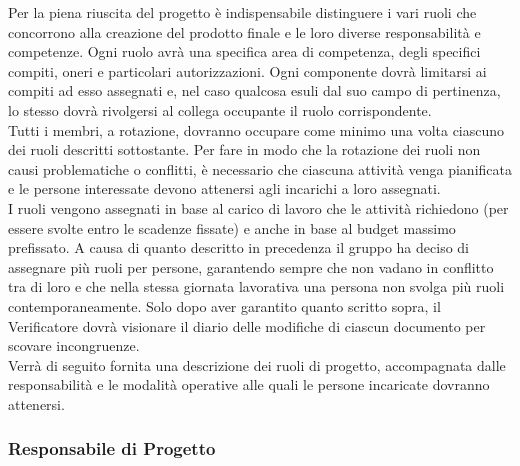 Per la piena riuscita del progetto è indispensabile distinguere i vari ruoli che concorrono alla creazione del prodotto finale e le loro diverse responsabilità e competenze.
Ogni ruolo avrà una specifica area di competenza, degli specifici compiti, oneri e particolari autorizzazioni. Ogni componente dovrà limitarsi ai compiti ad esso assegnati e, nel caso qualcosa esuli dal suo campo di pertinenza, lo stesso dovrà rivolgersi al collega occupante il ruolo corrispondente.\\
Tutti i membri, a rotazione, dovranno occupare come minimo una volta ciascuno dei ruoli descritti sottostante. Per fare in modo che la rotazione dei ruoli non causi problematiche o conflitti, è necessario che ciascuna attività venga pianificata e le persone interessate devono attenersi agli incarichi a loro assegnati.\\
I ruoli vengono assegnati in base al carico di lavoro che le attivit\`{a} richiedono (per essere svolte entro le scadenze fissate) e anche in base al budget massimo prefissato. A causa di quanto descritto in precedenza il gruppo ha deciso di assegnare più ruoli per persone, garantendo sempre che non vadano in conflitto tra di loro e che nella stessa giornata lavorativa una persona non svolga più ruoli contemporaneamente.
Solo dopo aver garantito quanto scritto sopra, il Verificatore dovrà visionare il diario delle modifiche di ciascun documento per scovare incongruenze.\\
Verrà di seguito fornita una descrizione dei ruoli di progetto, accompagnata dalle responsabilità e le modalità operative alle quali le persone incaricate dovranno attenersi.

\subsubsection{Responsabile di Progetto} %

